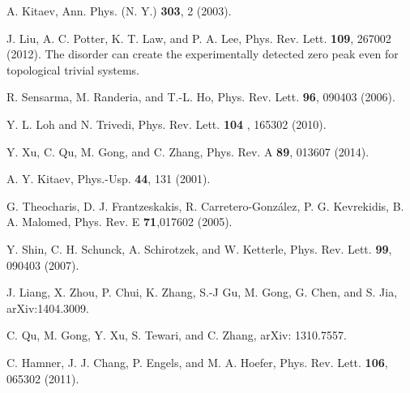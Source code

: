 \documentclass[prl,aps,twocolumn,showpacs, floatfix]{revtex4}
\begin{document}
\begin{thebibliography}{99}
 {A. Kitaev, Ann. Phys. (N. Y.) \textbf{303}, 2 (2003).%
}

 {J. Liu, A. C. Potter, K. T. Law, and P. A. Lee, Phys.
Rev. Lett. \textbf{109}, 267002 (2012). The disorder can create the
experimentally detected zero peak even for topological trivial systems.}

 {R. Sensarma, M. Randeria, and T.-L. Ho, Phys. Rev.
Lett. \textbf{96}, 090403 (2006).}

 {Y. L. Loh and N. Trivedi, Phys. Rev. Lett. \textbf{104}%
, 165302 (2010).}

 {Y. Xu, C. Qu, M. Gong, and C. Zhang, Phys. Rev. A
\textbf{89}, 013607 (2014). }

 {A. Y. Kitaev, Phys.-Usp. \textbf{44}, 131 (2001).}

 {G. Theocharis, D. J. Frantzeskakis, R.
Carretero-Gonz\'alez, P. G. Kevrekidis, B. A. Malomed, Phys. Rev. E \textbf{%
71},017602 (2005).}

 {Y. Shin, C. H. Schunck, A. Schirotzek, and W.
Ketterle, Phys. Rev. Lett. \textbf{99}, 090403 (2007).}

 {J. Liang, X. Zhou, P. Chui, K. Zhang, S.-J Gu, M.
Gong, G. Chen, and S. Jia, arXiv:1404.3009. }

 {C. Qu, M. Gong, Y. Xu, S. Tewari, and C. Zhang,
arXiv: 1310.7557. }

 {C. Hamner, J. J. Chang, P. Engels, and M. A. Hoefer,
Phys. Rev. Lett. \textbf{106}, 065302 (2011).}
\end{thebibliography}
\end{document}
